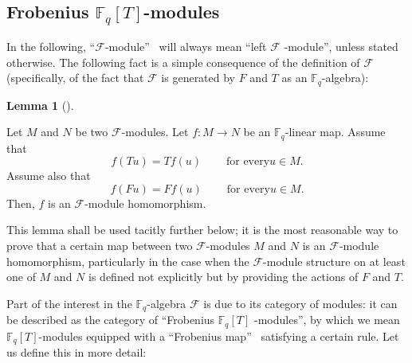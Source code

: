 \documentclass[numbers=enddot,12pt,final,onecolumn,notitlepage]{scrartcl}%
\theoremstyle{definition}
\newtheorem{lem}[theo]{Lemma}
\newenvironment{lemma}[1][]
{\begin{lem}[#1]\begin{leftbar}}
{\end{leftbar}\end{lem}}
\begin{document}
\subsection{Frobenius $\mathbb{F}_{q}\left[  T\right]  $-modules}

In the following, \textquotedblleft$\mathcal{F}$-module\textquotedblright%
\ will always mean \textquotedblleft left $\mathcal{F}$%
-module\textquotedblright, unless stated otherwise. The following fact is a
simple consequence of the definition of $\mathcal{F}$ (specifically, of the
fact that $\mathcal{F}$ is generated by $F$ and $T$ as an $\mathbb{F}_{q}$-algebra):

\begin{lemma}
\label{lem.F.modhom}Let $M$ and $N$ be two $\mathcal{F}$-modules. Let
$f:M\rightarrow N$ be an $\mathbb{F}_{q}$-linear map. Assume that%
\[
f\left(  Tu\right)  =Tf\left(  u\right)  \ \ \ \ \ \ \ \ \ \ \text{for every
}u\in M.
\]
Assume also that%
\[
f\left(  Fu\right)  =Ff\left(  u\right)  \ \ \ \ \ \ \ \ \ \ \text{for every
}u\in M.
\]
Then, $f$ is an $\mathcal{F}$-module homomorphism.
\end{lemma}

This lemma shall be used tacitly further below; it is the most reasonable way
to prove that a certain map between two $\mathcal{F}$-modules $M$ and $N$ is
an $\mathcal{F}$-module homomorphism, particularly in the case when the
$\mathcal{F}$-module structure on at least one of $M$ and $N$ is defined not
explicitly but by providing the actions of $F$ and $T$.

Part of the interest in the $\mathbb{F}_{q}$-algebra $\mathcal{F}$ is due to
its category of modules: it can be described as the category of
\textquotedblleft Frobenius $\mathbb{F}_{q}\left[  T\right]  $%
-modules\textquotedblright, by which we mean $\mathbb{F}_{q}\left[  T\right]
$-modules equipped with a \textquotedblleft Frobenius map\textquotedblright%
\ satisfying a certain rule. Let us define this in more detail:
\end{document}
